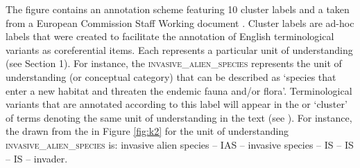 \documentclass[output=paper]{langsci/langscibook.cls}
\begin{document}

The figure contains an annotation scheme featuring 10 cluster labels and a  taken from a European Commission Staff Working document \citep[2]{Commission2008}. Cluster labels are ad-hoc labels that were created to facilitate the annotation of English terminological variants as coreferential items. Each  represents a particular unit of understanding (see Section 1). For instance, the  \textsc{invasive\_alien\_species} represents the unit of understanding (or conceptual category) that can be described as `species 
that enter a new habitat and threaten the endemic fauna and/or flora'. Terminological variants that are annotated according to this label will appear in the  or `cluster' of terms denoting the same unit of understanding in the text 
(see ). For instance, the  drawn from the  in Figure \ref{fig:k2} for the unit of understanding \textsc{invasive\_alien\_species} is: invasive 
alien species -- IAS -- invasive species -- IS -- IS -- IS -- invader.
\end{document}
